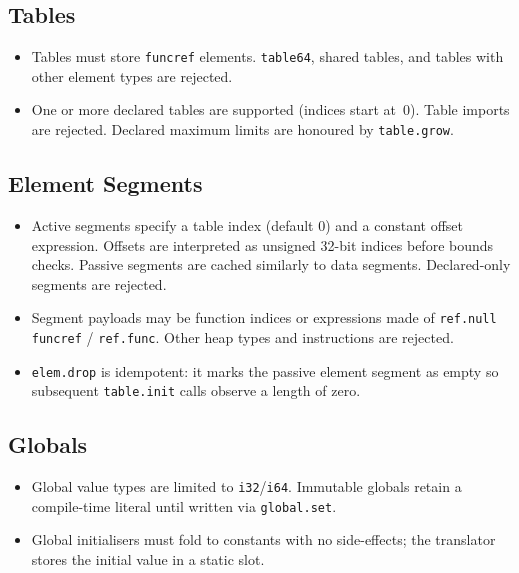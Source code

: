 \documentclass[11pt]{article}
\begin{document}
\subsection{Tables}
\begin{itemize}[nosep]
    \item Tables must store \texttt{funcref} elements. \texttt{table64}, shared tables, and tables with other element types are rejected.
    \item One or more declared tables are supported (indices start at~0). Table imports are rejected. Declared maximum limits are honoured by \texttt{table.grow}.
\end{itemize}

\subsection{Element Segments}
\begin{itemize}[nosep]
    \item Active segments specify a table index (default 0) and a constant offset expression. Offsets are interpreted as unsigned 32-bit indices before bounds checks. Passive segments are cached similarly to data segments. Declared-only segments are rejected.
    \item Segment payloads may be function indices or expressions made of \texttt{ref.null funcref} / \texttt{ref.func}. Other heap types and instructions are rejected.
    \item \texttt{elem.drop} is idempotent: it marks the passive element segment as empty so subsequent \texttt{table.init} calls observe a length of zero.
\end{itemize}

\subsection{Globals}
\begin{itemize}[nosep]
    \item Global value types are limited to \texttt{i32}/\texttt{i64}. Immutable globals retain a compile-time literal until written via \texttt{global.set}.
    \item Global initialisers must fold to constants with no side-effects; the translator stores the initial value in a static slot.
\end{itemize}
\end{document}
